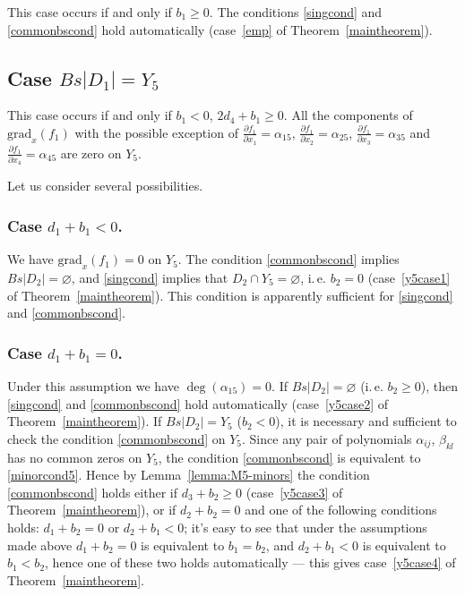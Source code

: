 \documentclass[12pt]{amsart}
\theoremstyle{definition}
\theoremstyle{remark}
\begin{document}
This case occurs if and only if $b_1\geqslant 0$. The conditions 
\ref{singcond}  and \ref{commonbscond}  hold automatically
(case~\ref{emp} of Theorem~\ref{maintheorem}).

\subsection{Case $Bs|D_1|=Y_5$}

This case occurs if and only if $b_1<0$, $2d_4+b_1\geqslant 0$.
All the components of ${\mathrm{grad}_x}(f_1)$ with the possible exception 
of 
$\frac{\partial f_1}{\partial x_1}=\alpha_{15}$, $\frac{\partial f_1}{\partial x_2}=\alpha_{25}$,
$\frac{\partial f_1}{\partial x_3}=\alpha_{35}$ and 
$\frac{\partial f_1}{\partial x_4}=\alpha_{45}$ are zero on $Y_5$. 

Let us consider several possibilities.

\subsubsection{Case $d_1+b_1<0$.} 
We have ${\mathrm{grad}_x}(f_1)=0$ on $Y_5$. The condition \ref{commonbscond} 
implies
$Bs|D_2|=\varnothing$, and \ref{singcond}  implies that 
$D_2\cap Y_5=\varnothing$, i.\,e. $b_2=0$
(case~\ref{y5case1} of Theorem~\ref{maintheorem}). 
This condition is apparently sufficient for \ref{singcond}  and 
\ref{commonbscond}. 

\subsubsection{Case $d_1+b_1=0$.} 
Under this assumption we have $\deg(\alpha_{15})=0$. If 
$Bs|D_2|=\varnothing$ (i.\,e. $b_2\geqslant 0$), then \ref{singcond}  and
\ref{commonbscond} hold automatically
(case~\ref{y5case2} of Theorem~\ref{maintheorem}). 
If $Bs|D_2|=Y_5$ ($b_2<0$), it is necessary and sufficient to check the 
condition \ref{commonbscond}  on $Y_5$. Since any pair of polynomials  
$\alpha_{ij}$, $\beta_{kl}$ has no common zeros on $Y_5$, the condition 
\ref{commonbscond} is equivalent to \ref{minorcond5}.
Hence by Lemma~\ref{lemma:M5-minors} the condition \ref{commonbscond} 
holds either if $d_3+b_2\geqslant 0$ 
(case~\ref{y5case3} of Theorem~\ref{maintheorem}), 
or if $d_2+b_2=0$ and one of the following conditions holds: 
$d_1+b_2=0$ or $d_2+b_1<0$;
it's easy to see that under the assumptions made above 
$d_1+b_2=0$ is equivalent to $b_1=b_2$, and $d_2+b_1<0$ is equivalent to 
$b_1<b_2$, hence one of these two holds automatically --- this gives
case~\ref{y5case4} of Theorem~\ref{maintheorem}. 
\end{document}
